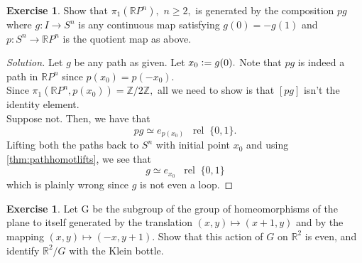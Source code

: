 \documentclass[12pt]{article}
\theoremstyle{definition}
\numberwithin{thm}{section}
\newtheorem{exe}[thm]{Exercise}
\newcommand{\rel}{\;\;\operatorname{rel}\;}
\newenvironment{soln}{\begin{proof}[Solution]}{\end{proof}}
\begin{document}
\begin{exe}
	Show that $\pi_1(\mathbb{R}P^n),$ $n \ge 2,$ is generated by the composition $pg$ where $g : I \to S^n$ is any continuous map satisfying $g(0) = -g(1)$ and $p: S^n \to \mathbb{R}P^n$ is the quotient map as above.
\end{exe}
\begin{soln}
	Let $g$ be any path as given. Let $x_0 \vcentcolon= g(0).$ Note that $pg$ is indeed a path in $\mathbb{R}P^n$ since $p(x_0) = p(-x_0).$\\
	Since $\pi_1(\mathbb{R}P^n, p(x_0)) = \mathbb{Z}/2\mathbb{Z},$ all we need to show is that $[pg]$ isn't the identity element.\\
	Suppose not. Then, we have that
	\begin{equation*} 
		pg \simeq e_{p(x_0)} \rel \{0, 1\}.
	\end{equation*}
	Lifting both the paths back to $S^n$ with initial point $x_0$ and using \cref{thm:pathhomotlifts}, we see that
	\begin{equation*} 
		g \simeq e_{x_0} \rel\{0, 1\}
	\end{equation*}
	which is plainly wrong since $g$ is not even a loop.
\end{soln}
%
%
%
\begin{exe}
	Let G be the subgroup of the group of homeomorphisms of the plane to itself generated by the translation $(x, y) \mapsto (x + 1, y)$ and by the mapping $(x, y) \mapsto (-x, y + 1).$ Show that this action of $G$ on $\mathbb{R}^2$ is even, and identify $\mathbb{R}^2/G$ with the Klein bottle.
\end{exe}
\end{document}
